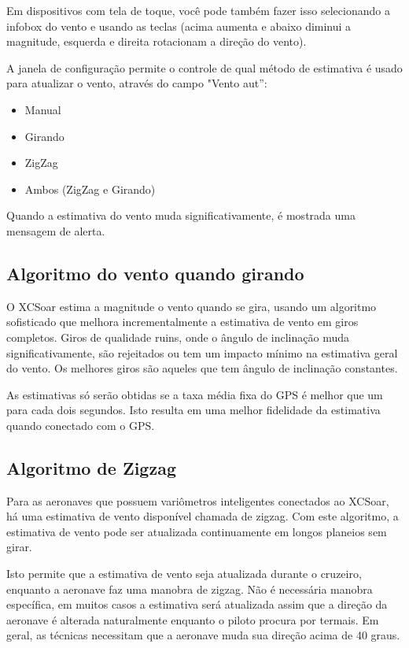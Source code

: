 Em dispositivos com tela de toque, você pode também fazer isso selecionando a infobox do vento e usando as teclas (acima aumenta e abaixo diminui a magnitude, esquerda e direita rotacionam a direção do vento).


A janela de configuração  permite o controle de qual método de estimativa é usado para atualizar o vento, através do campo "Vento aut”:
\begin{itemize}
\item Manual
\item Girando
\item ZigZag
\item Ambos (ZigZag e Girando)
\end{itemize}

Quando a estimativa do vento muda significativamente, é mostrada uma mensagem de alerta.
 

\subsection*{Algoritmo do vento quando girando}

O XCSoar estima a magnitude o vento quando se gira, usando um algoritmo sofisticado que melhora incrementalmente a estimativa de vento em giros completos.  Giros de qualidade ruins, onde o ângulo de inclinação muda significativamente, são rejeitados ou tem um impacto mínimo na estimativa geral do vento. Os melhores giros são aqueles que tem ângulo de inclinação constantes.

As estimativas só serão obtidas se a taxa média fixa do GPS é melhor que um para cada dois segundos.  Isto resulta em uma melhor fidelidade da estimativa quando conectado com o GPS.



\subsection*{Algoritmo de Zigzag}

Para as aeronaves que possuem variômetros inteligentes conectados ao XCSoar, há uma estimativa de vento disponível chamada de zigzag.  Com este algoritmo, a estimativa de vento pode ser atualizada continuamente em longos planeios sem girar.

Isto permite que a estimativa de vento seja atualizada durante o cruzeiro, enquanto a aeronave faz uma manobra de zigzag.  Não é necessária manobra específica, em muitos casos a estimativa será atualizada assim que a direção da aeronave é alterada naturalmente enquanto o piloto procura por termais.  Em geral, as técnicas necessitam que a aeronave muda sua direção acima de 40 graus.

